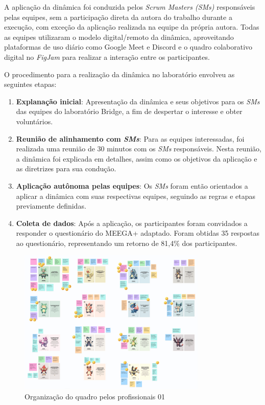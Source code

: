 \documentclass[
	12pt,
	openright,
	twoside,
	a4paper,
	english,
	brazil
	]{abntex2}
\begin{document}
A aplicação da dinâmica foi conduzida pelos \textit{Scrum Masters (SMs)} responsáveis pelas equipes, sem a participação direta da autora do trabalho durante a execução, com exceção da aplicação realizada na equipe da própria autora. Todas as equipes utilizaram o modelo digital/remoto da dinâmica, aproveitando plataformas de uso diário como Google Meet e Discord e o quadro colaborativo digital no \textit{FigJam} para realizar a interação entre os participantes.

O procedimento para a realização da dinâmica no laboratório envolveu as seguintes etapas:
\begin{enumerate}
  \item \textbf{Explanação inicial}: Apresentação da dinâmica e seus objetivos para os \textit{SMs} das equipes do laboratório Bridge, a fim de despertar o interesse e obter voluntários.
  \item \textbf{Reunião de alinhamento com \textit{SMs}}: Para as equipes interessadas, foi realizada uma reunião de 30 minutos com os \textit{SMs} responsáveis. Nesta reunião, a dinâmica foi explicada em detalhes, assim como os objetivos da aplicação e as diretrizes para sua condução.
  \item \textbf{Aplicação autônoma pelas equipes}: Os \textit{SMs} foram então orientados a aplicar a dinâmica com suas respectivas equipes, seguindo as regras e etapas previamente definidas.
  \item \textbf{Coleta de dados}: Após a aplicação, os participantes foram convidados a responder o questionário do MEEGA+ adaptado. Foram obtidas 35 respostas ao questionário, representando um retorno de 81,4\% dos participantes.
\end{enumerate}

\begin{figure}[H]
  \centering
	\caption{\label{bridge-print-quadro-1} Organização do quadro pelos profissionais 01}
  \includegraphics[width=0.8\textwidth]{bridge-print-quadro-1}
\end{figure}
\end{document}
